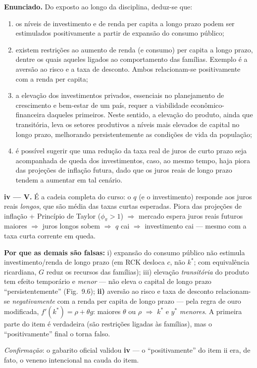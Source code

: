 \documentclass[12pt, a4paper]{article}
\begin{document}
\textbf{Enunciado.} Do exposto ao longo da disciplina, deduz-se que:

\begin{enumerate}[label=\roman*)]
\item os níveis de investimento e de renda per capita a longo prazo podem ser
estimulados positivamente a partir de expansão do consumo público;
\item existem restrições ao aumento de renda (e consumo) per capita a longo
prazo, dentre os quais aqueles ligados ao comportamento das famílias. Exemplo
é a aversão ao risco e a taxa de desconto. Ambos relacionam-se positivamente
com a renda per capita;
\item a elevação dos investimentos privados, essenciais no planejamento de
crescimento e bem-estar de um país, requer a viabilidade econômico-financeira
daqueles primeiros. Neste sentido, a elevação do produto, ainda que
transitória, leva os setores produtivos a níveis mais elevados de capital no
longo prazo, melhorando persistentemente as condições de vida da população;
\item é possível sugerir que uma redução da taxa real de juros de curto prazo
seja acompanhada de queda dos investimentos, caso, ao mesmo tempo, haja piora
das projeções de inflação futura, dado que os juros reais de longo prazo
tendem a aumentar em tal cenário.
\end{enumerate}

\begin{correctbox}[title={Resposta: iv) --- confirmada pelo gabarito oficial}]
\textbf{iv --- V.} É a cadeia completa do curso: o $q$ (e o investimento)
responde aos juros reais \emph{longos}, que são média das taxas curtas
esperadas. Piora das projeções de inflação + Princípio de Taylor
($\phi_\pi>1$) $\Rightarrow$ mercado espera juros reais futuros maiores
$\Rightarrow$ juros longos sobem $\Rightarrow$ $q$ cai $\Rightarrow$
investimento cai --- mesmo com a taxa curta corrente em queda.

\textbf{Por que as demais são falsas:} i) expansão do consumo público não
estimula investimento/renda de longo prazo (em RCK desloca $c$, não $k^*$;
com equivalência ricardiana, $G$ reduz os recursos das famílias);
iii) elevação \emph{transitória} do produto tem efeito temporário e
\emph{menor} --- não eleva o capital de longo prazo ``persistentemente''
(Fig.\ 9.6); \textbf{ii)} aversão ao risco e taxa de desconto relacionam-se
\emph{negativamente} com a renda per capita de longo prazo --- pela regra de
ouro modificada, $f'(k^*) = \rho + \theta g$: maiores $\theta$ ou $\rho$
$\Rightarrow$ $k^*$ e $y^*$ \emph{menores}. A primeira parte do item é
verdadeira (são restrições ligadas às famílias), mas o ``positivamente''
final o torna falso.

\emph{Confirmação}: o gabarito oficial validou \textbf{iv} --- o
``positivamente'' do item ii era, de fato, o veneno intencional na cauda do
item.
\end{correctbox}
\end{document}
